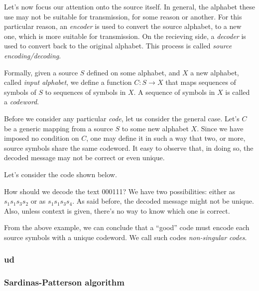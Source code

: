 \documentclass{subfiles}
\begin{document}
    Let's now focus our attention onto the source itself.
    In general, the alphabet these use may not be suitable for transmission,
        for some reason or another. For this particular reason, 
        an \emph{encoder} is used to convert the source alphabet,
        to a new one, which is more suitable for transmission.
        On the recieving side, 
        a \emph{decoder} is used to convert back to the original alphabet.
        This process is called \emph{source encoding/decoding}.

    Formally, given a source \(S\) defined on some alphabet, 
        and \(X\) a new alphabet, called \emph{input alphabet}, 
        we define a function \(C : S \to X\) that maps sequences of symbols of \(S\)
        to sequences of symbols in \(X\). 
        A sequence of symbols in \(X\) is called a \emph{codeword}.

    Before we consider any particular \emph{code},
        let us consider the general case. 
        Let's \(C\) be a generic mapping from a source \(S\) to some new alphabet \(X\).
        Since we have imposed no condition on \(C\), 
        one may define it in such a way that two, or more,
        source symbols share the same codeword.
        It easy to observe that, in doing so,
        the decoded message may not be correct or even unique.

    \begin{example*}
        Let's consider the code shown below.
        
        How should we decode the text 000111? 
            We have two possibilities: 
                either as \(s_{1}s_{1}s_{3}s_{2}\) or as \(s_{1}s_{1}s_{3}s_{4}\).
        As said before, the decoded message might not be unique. 
        Also, unless context is given, there's no way to know which one is correct.
    \end{example*}

    From the above example, we can conclude that a ``good'' code must encode each 
    source symbols with a unique codeword. 
    We call such codes \emph{non-singular codes}.
  
    \subsubsection{\Gls{ud}}\label{Sec:1.2.1}
    

    \subsubsection{Sardinas-Patterson algorithm}
    
\end{document}
